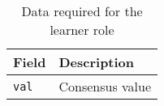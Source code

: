 \begin{table}[H]
\begin{tabular}{|l|l|}
\hline \textbf{Field} & \textbf{Description} \\
\hline \texttt{val} & Consensus value \\
\hline
\end{tabular}
\caption{Data required for the learner role}
\label{paxos.learner.fields}
\end{table}
